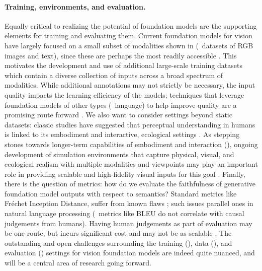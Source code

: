\paragraph{Training, environments, and evaluation.} Equally critical to realizing the potential of foundation models are the supporting elements for training and evaluating them. Current foundation models for vision have largely focused on a small subset of modalities shown in  (\eg~datasets of RGB images and text), since these are perhaps the most readily accessible \cite{changpinyo2021cc12m,radford2021learning}. This motivates the development and use of additional large-scale training datasets which contain a diverse collection of inputs across a broad spectrum of modalities. While additional annotations may not strictly be necessary, the input quality impacts the learning efficiency of the models; techniques that leverage foundation models of other types (\eg~language) to help improve quality are a promising route forward \cite{zellers2021merlot}. 
We also want to consider settings beyond static datasets: classic studies have suggested that perceptual understanding in humans is linked to its embodiment and interactive, ecological settings \cite{gibson1979ecological}. As stepping stones towards longer-term capabilities of embodiment and interaction (), ongoing development of simulation environments that capture physical, visual, and ecological realism with multiple modalities and viewpoints may play an important role in providing scalable and high-fidelity visual inputs for this goal \cite{kolve2017ai2thor,habitat19iccv,gan2020threedworld,shen2021igibson,srivastava2021behavior}. Finally, there is the question of metrics: how do we evaluate the faithfulness of generative foundation model outputs with respect to semantics? Standard metrics like Fr\'{e}chet Inception Distance, suffer from known flaws \cite{bikowski2018demystifying}; such issues parallel ones in natural language processing (\eg~metrics like BLEU do not correlate with causal judgements from humans). Having human judgements as part of evaluation may be one route, but incurs significant cost and may not be as scalable \cite{zhou2019hype,khashabi2021genie}. The outstanding and open challenges surrounding the training (), data (), and evaluation () settings for vision foundation models are indeed quite nuanced, and will be a central area of research going forward.

